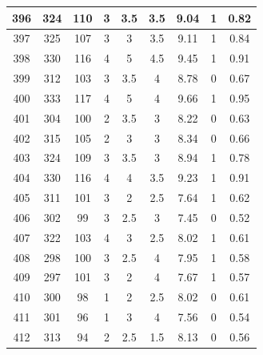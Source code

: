 \documentclass[11pt]{article}
\begin{document}
\begin{appendix}
\begin{longtable}[H]{|c|c|c|c|c|c|c|c|c|}
	396        & 324       & 110         & 3                 & 3.5 & 3.5 & 9.04 & 1        & 0.82            \\ \hline
	397        & 325       & 107         & 3                 & 3   & 3.5 & 9.11 & 1        & 0.84            \\ \hline
	398        & 330       & 116         & 4                 & 5   & 4.5 & 9.45 & 1        & 0.91            \\ \hline
	399        & 312       & 103         & 3                 & 3.5 & 4   & 8.78 & 0        & 0.67            \\ \hline
	400        & 333       & 117         & 4                 & 5   & 4   & 9.66 & 1        & 0.95            \\ \hline
	401        & 304       & 100         & 2                 & 3.5 & 3   & 8.22 & 0        & 0.63            \\ \hline
	402        & 315       & 105         & 2                 & 3   & 3   & 8.34 & 0        & 0.66            \\ \hline
	403        & 324       & 109         & 3                 & 3.5 & 3   & 8.94 & 1        & 0.78            \\ \hline
	404        & 330       & 116         & 4                 & 4   & 3.5 & 9.23 & 1        & 0.91            \\ \hline
	405        & 311       & 101         & 3                 & 2   & 2.5 & 7.64 & 1        & 0.62            \\ \hline
	406        & 302       & 99          & 3                 & 2.5 & 3   & 7.45 & 0        & 0.52            \\ \hline
	407        & 322       & 103         & 4                 & 3   & 2.5 & 8.02 & 1        & 0.61            \\ \hline
	408        & 298       & 100         & 3                 & 2.5 & 4   & 7.95 & 1        & 0.58            \\ \hline
	409        & 297       & 101         & 3                 & 2   & 4   & 7.67 & 1        & 0.57            \\ \hline
	410        & 300       & 98          & 1                 & 2   & 2.5 & 8.02 & 0        & 0.61            \\ \hline
	411        & 301       & 96          & 1                 & 3   & 4   & 7.56 & 0        & 0.54            \\ \hline
	412        & 313       & 94          & 2                 & 2.5 & 1.5 & 8.13 & 0        & 0.56            \\ \hline

\end{longtable}
\end{appendix}
\end{document}
